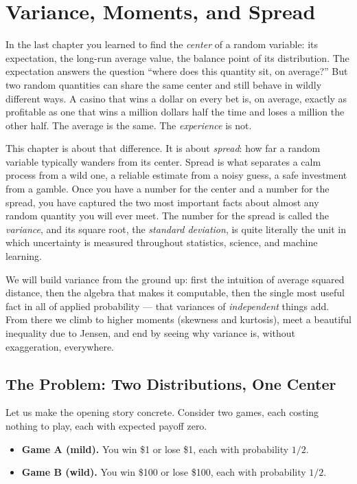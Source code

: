 \chapter{Variance, Moments, and Spread}

In the last chapter you learned to find the \emph{center} of a random
variable: its expectation, the long-run average value, the balance point of
its distribution. The expectation answers the question ``where does this
quantity sit, on average?'' But two random quantities can share the same
center and still behave in wildly different ways. A casino that wins a dollar
on every bet is, on average, exactly as profitable as one that wins a million
dollars half the time and loses a million the other half. The average is the
same. The \emph{experience} is not.

This chapter is about that difference. It is about \emph{spread}: how far a
random variable typically wanders from its center. Spread is what separates a
calm process from a wild one, a reliable estimate from a noisy guess, a safe
investment from a gamble. Once you have a number for the center and a number
for the spread, you have captured the two most important facts about almost
any random quantity you will ever meet. The number for the spread is called
the \emph{variance}, and its square root, the \emph{standard deviation}, is
quite literally the unit in which uncertainty is measured throughout
statistics, science, and machine learning.

We will build variance from the ground up: first the intuition of average
squared distance, then the algebra that makes it computable, then the single
most useful fact in all of applied probability --- that variances of
\emph{independent} things add. From there we climb to higher moments
(skewness and kurtosis), meet a beautiful inequality due to Jensen, and end by
seeing why variance is, without exaggeration, everywhere.

\chapterline

\section{The Problem: Two Distributions, One Center}
\label{ch09:problem}

Let us make the opening story concrete. Consider two games, each costing
nothing to play, each with expected payoff zero.

\begin{itemize}
  \item \textbf{Game A (mild).} You win \$1 or lose \$1, each with
        probability $1/2$.
  \item \textbf{Game B (wild).} You win \$100 or lose \$100, each with
        probability $1/2$.
\end{itemize}

